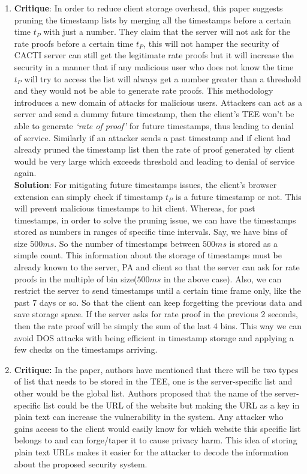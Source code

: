 \documentclass[runningheads,10pt]{llncs}
\begin{document}
\begin{enumerate}
		\item \textbf{Critique}: In order to reduce client storage overhead, this paper suggests pruning the timestamp lists by merging all the timestamps before a certain time $t_P$ with just a number. They claim that the server will not ask for the rate proofs before a certain time $t_P$, this will not hamper the security of CACTI server can still get the legitimate rate proofs but it will increase the security in a manner that if any malicious user who does not know the time $t_P$ will try to access the list will always get a number greater than a threshold and they would not be able to generate rate proofs. This methodology introduces a new domain of attacks for malicious users. Attackers can act as a server and send a dummy future timestamp, then the client’s TEE won’t be able to generate \textit{‘rate of proof’} for future timestamps, thus leading to denial of service. Similarly if an attacker sends a past timestamp and if client had already pruned the timestamp list then the rate of proof generated by client would be very large which exceeds threshold and leading to denial of service again. \\

		\textbf{Solution}: For mitigating future timestamps issues, the client’s browser extension can simply check if timestamp $t_P$ is a future timestamp or not. This will prevent malicious timestamps to hit client. Whereas, for past timestamps, in order to solve the pruning issue, we can have the timestamps stored as numbers in ranges of specific time intervals. Say, we have bins of size $500ms$. So the number of timestamps between $500ms$ is stored as a simple count. This information about the storage of timestamps must be already known to the server, PA and client so that the server can ask for rate proofs in the multiple of bin size($500ms$ in the above case). Also, we can restrict the server to send timestamps until a certain time frame only, like the past 7 days or so. So that the client can keep forgetting the previous data and save storage space. If the server asks for rate proof in the previous 2 seconds, then the rate proof will be simply the sum of the last 4 bins. This way we can avoid DOS attacks with being efficient in timestamp storage and applying a few checks on the timestamps arriving.\\

		\item \textbf{Critique:} In the paper, authors have mentioned that there will be two types of list that needs to be stored in the TEE, one is the server-specific list and other would be the global list. Authors proposed that the name of the server-specific list could be the URL of the website but making the URL as a key in plain text can increase the vulnerability in the system. Any attacker who gains access to the client would easily know for which  website this specific list belongs to and can forge/taper it to cause privacy harm. This idea of storing plain text URLs makes it easier for the attacker to decode the information about the proposed security system.\\


\end{enumerate}
\end{document}
